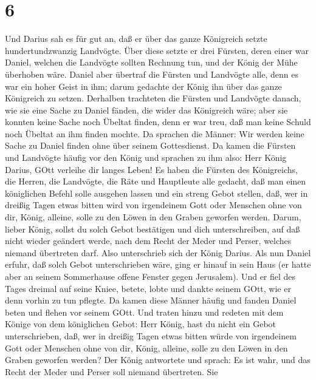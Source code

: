 \hypertarget{section-5}{%
\section{6}\label{section-5}}

 Und Darius sah es für gut an, daß er über das ganze
Königreich setzte hundertundzwanzig Landvögte.  Über diese
setzte er drei Fürsten, deren einer war Daniel, welchen die Landvögte
sollten Rechnung tun, und der König der Mühe überhoben wäre.
 Daniel aber übertraf die Fürsten und Landvögte alle, denn
es war ein hoher Geist in ihm; darum gedachte der König ihn über das
ganze Königreich zu setzen.  Derhalben trachteten die
Fürsten und Landvögte danach, wie sie eine Sache zu Daniel fänden, die
wider das Königreich wäre; aber sie konnten keine Sache noch Übeltat
finden, denn er war treu, daß man keine Schuld noch Übeltat an ihm
finden mochte.  Da sprachen die Männer: Wir werden keine
Sache zu Daniel finden ohne über seinem Gottesdienst.  Da
kamen die Fürsten und Landvögte häufig vor den König und sprachen zu ihm
also: Herr König Darius, GOtt verleihe dir langes Leben!  Es
haben die Fürsten des Königreichs, die Herren, die Landvögte, die Räte
und Hauptleute alle gedacht, daß man einen königlichen Befehl solle
ausgehen lassen und ein streng Gebot stellen, daß, wer in dreißig Tagen
etwas bitten wird von irgendeinem Gott oder Menschen ohne von dir,
König, alleine, solle zu den Löwen in den Graben geworfen werden.
 Darum, lieber König, sollst du solch Gebot bestätigen und
dich unterschreiben, auf daß nicht wieder geändert werde, nach dem Recht
der Meder und Perser, welches niemand übertreten darf.  Also
unterschrieb sich der König Darius.  Als nun Daniel erfuhr,
daß solch Gebot unterschrieben wäre, ging er hinauf in sein Haus (er
hatte aber an seinem Sommerhause offene Fenster gegen Jerusalem). Und er
fiel des Tages dreimal auf seine Kniee, betete, lobte und dankte seinem
GOtt, wie er denn vorhin zu tun pflegte.  Da kamen diese
Männer häufig und fanden Daniel beten und flehen vor seinem GOtt.
 Und traten hinzu und redeten mit dem Könige von dem
königlichen Gebot: Herr König, hast du nicht ein Gebot unterschrieben,
daß, wer in dreißig Tagen etwas bitten würde von irgendeinem Gott oder
Menschen ohne von dir, König, alleine, solle zu den Löwen in den Graben
geworfen werden? Der König antwortete und sprach: Es ist wahr, und das
Recht der Meder und Perser soll niemand übertreten.  Sie
